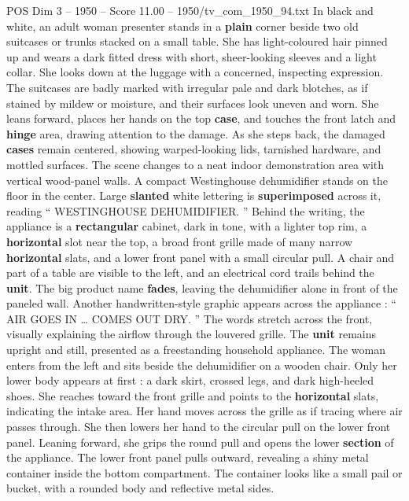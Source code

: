 \begin{textsample}{POS Dim 3 – 1950 – Score 11.00 – 1950/tv\_com\_1950\_94.txt}  \label{ex:f3_pos_017}
In black and white, an adult woman presenter stands in a \textbf{plain} corner beside two old suitcases or trunks stacked on a small table.
She has light-coloured hair pinned up and wears a dark fitted dress with short, sheer-looking sleeves and a light collar.
She looks down at the luggage with a concerned, inspecting expression.
The suitcases are badly marked with irregular pale and dark blotches, as if stained by mildew or moisture, and their surfaces look uneven and worn.
She leans forward, places her hands on the top \textbf{case}, and touches the front latch and \textbf{hinge} area, drawing attention to the damage.
As she steps back, the damaged \textbf{cases} remain centered, showing warped-looking lids, tarnished hardware, and mottled surfaces.
The scene changes to a neat indoor demonstration area with vertical wood-panel walls.
A compact Westinghouse dehumidifier stands on the floor in the center.
Large \textbf{slanted} white lettering is \textbf{superimposed} across it, reading “ WESTINGHOUSE DEHUMIDIFIER. ” Behind the writing, the appliance is a \textbf{rectangular} cabinet, dark in tone, with a lighter top rim, a \textbf{horizontal} slot near the top, a broad front grille made of many narrow \textbf{horizontal} slats, and a lower front panel with a small circular pull.
A chair and part of a table are visible to the left, and an electrical cord trails behind the \textbf{unit}.
The big product name \textbf{fades}, leaving the dehumidifier alone in front of the paneled wall.
Another handwritten-style graphic appears across the appliance : “ AIR GOES IN … COMES OUT DRY. ” The words stretch across the front, visually explaining the airflow through the louvered grille.
The \textbf{unit} remains upright and still, presented as a freestanding household appliance.
The woman enters from the left and sits beside the dehumidifier on a wooden chair.
Only her lower body appears at first : a dark skirt, crossed legs, and dark high-heeled shoes.
She reaches toward the front grille and points to the \textbf{horizontal} slats, indicating the intake area.
Her hand moves across the grille as if tracing where air passes through.
She then lowers her hand to the circular pull on the lower front panel.
Leaning forward, she grips the round pull and opens the lower \textbf{section} of the appliance.
The lower front panel pulls outward, revealing a shiny metal container inside the bottom compartment.
The container looks like a small pail or bucket, with a rounded body and reflective metal sides.

\end{textsample}
